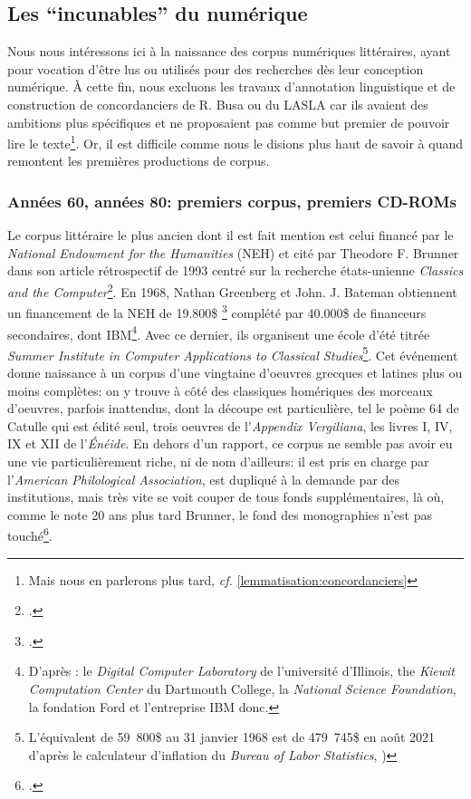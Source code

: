 \subsection{Les \enquote{incunables} du numérique}

Nous nous intéressons ici à la naissance des corpus numériques littéraires, ayant pour vocation d'être lus ou utilisés pour des recherches dès leur conception numérique. À cette fin, nous excluons les travaux d'annotation linguistique et de construction de concordanciers de R. Busa ou du LASLA  car ils avaient des ambitions plus spécifiques et ne proposaient pas comme but premier de pouvoir lire le texte\footnote{Mais nous en parlerons plus tard, \textit{cf.} \ref{lemmatisation:concordanciers}}. Or, il est difficile comme nous le disions plus haut de savoir à quand remontent les premières productions de corpus.


\subsubsection{Années 60, années 80: premiers corpus, premiers CD-ROMs}

Le corpus littéraire le plus ancien dont il est fait mention est celui financé par le \textit{National Endowment for the Humanities} (NEH) et cité par Theodore F. Brunner dans son article rétrospectif de 1993 centré sur la recherche états-unienne \textit{Classics and the Computer}\footcite{brunner_classics_1993}. En 1968, Nathan Greenberg et John. J. Bateman obtiennent un financement de la NEH de 19.800\$ \footcite{noauthor_neh_2018} complété par 40.000\$ de financeurs secondaires, dont IBM\footnote{D'après \cite{brunner_classics_1993}: le \textit{Digital Computer Laboratory} de l'université d'Illinois, the \textit{Kiewit Computation Center} du Dartmouth College, la \textit{National Science Foundation}, la fondation Ford et l'entreprise IBM donc.}. Avec ce dernier, ils organisent une école d'été titrée \textit{Summer Institute in Computer Applications to Classical Studies}\footnote{L'équivalent de 59~800\$ au 31 janvier 1968 est de 479~745\$ en août 2021 d'après le calculateur d'inflation du \textit{Bureau of Labor Statistics}, \cite{noauthor_cpi_nodate})}. Cet événement donne naissance à un corpus d'une vingtaine d'oeuvres grecques et latines plus ou moins complètes: on y trouve à côté des classiques homériques des morceaux d'oeuvres, parfois inattendus, dont la découpe est particulière, tel le poème 64 de Catulle qui est édité seul, trois oeuvres de l'\textit{Appendix Vergiliana}, les livres I, IV, IX et XII de l'\textit{Énéide}. En dehors d'un rapport, ce corpus ne semble pas avoir eu une vie particulièrement riche, ni de nom d'ailleurs: il est pris en charge par l'\textit{American Philological Association}, est dupliqué à la demande par des institutions, mais très vite se voit couper de tous fonds supplémentaires, là où, comme le note 20 ans plus tard Brunner, le fond des monographies n'est pas touché\footcite{brunner_classics_1993}.

